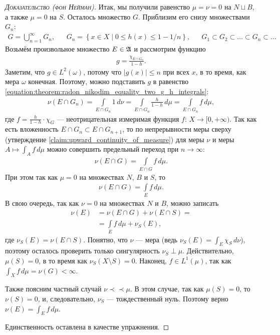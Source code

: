 \begin{proof}[\normalfont\textsc{Доказательство (фон Нейман)}]
 Итак, мы получили равенство $\mu = \nu = 0$ на $N \sqcup B$, а также $\mu = 0$ на $S$. Осталось множество $G$. Приблизим его снизу множествами $G_n$:
 \begin{align*}
  G = \bigcup_{n=1}^{\infty} G_n, & &G_n = \left\{ x \in X \mid 0 \leqslant h(x) \leqslant 1 - 1 / n \right\}, & &G_1 \subset G_2 \subset \ldots \subset G_n \subset \ldots
 \end{align*} Возьмём произвольное множество $E \in \mathfrak{A}$ и рассмотрим функцию 
 \begin{align*}
  g = \frac{\chi_{E \cap G_n}}{1 - h}
 .\end{align*} Заметим, что $g \in L^{2}(\omega)$, потому что $\left| g(x) \right| \leqslant n$ при всех $x$, в то время, как мера $\omega$ конечная. Поэтому, можно подставить $g$ в равенство \eqref{equation:theorem:radon_nikodim_equality_two_g_h_integrals}:
 \begin{align*}
  \nu(E \cap G_n) = \int\limits_{E \cap G_n} 1 \, d\nu = \int\limits_{E \cap G_n}   \frac{h}{1-h}\,d\mu = \int\limits_{E \cap G_n} f \, d\mu 
 ,\end{align*} где $f = \frac{h}{1-h} \cdot \chi_{G}$ --- неотрицательная измеримая функция $f \colon\, X \to [0, +\infty)$. Так как есть вложенность $E \cap G_n \subset E \cap G_{n+1} $, то по непрерывности меры сверху (утверждение \ref{claim:upward_continuity_of_measure}) для меры $\nu$ и меры $A \mapsto \int_{A} f \,d\mu  $ можно совершить предельный переход при $n \to \infty$:
 \begin{align*}
  \nu(E \cap G) = \int\limits_{E \cap G}   f \, d\mu
 .\end{align*} При этом так как $\mu = 0$ на множествах $N$, $B$ и $S$, то
 \begin{align*}
  \nu(E \cap G) = \int\limits_{E} f \, d\mu 
 .\end{align*} В свою очередь, так как $\nu = 0$ на множествах $N$ и $B$, можно записать
 \begin{align*}
  \nu(E) &= \nu(E \cap G) + \nu(E \cap S) = \\
  &= \int\limits_{E} f \, d\mu + \nu_S(E)
 ,\end{align*} где $\nu_S(E) = \nu(E \cap S)$. Понятно, что $\nu$ --- мера (ведь $\nu_S(E) = \int_{E} \chi_S \, d\nu  $), поэтому осталось проверить только сингулярность $\nu_S \perp \mu$. Действительно, $\mu(S) = 0$, в то время как $\nu_S(X \setminus S) = 0$. Наконец, $f \in L^{1}(\mu)$, так как $\int_{X} f \, d\mu = \nu(G) < \infty$.

 Также поясним частный случай $\nu \prec \prec \mu$. В этом случае, так как $\mu(S) = 0$, то $\nu(S) = 0$, и, следовательно, $\nu_S$ --- тождественный нуль. Поэтому верно $\nu(E) = \int_{E} f \,d\mu  $.

 Единственность оставлена в качестве упражнения.
\end{proof}

